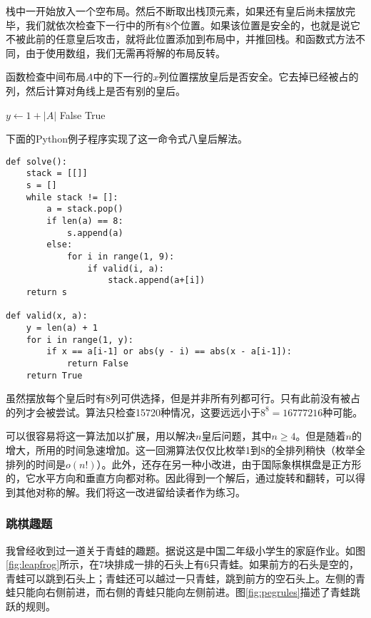 \documentclass[UTF8]{article}
\begin{document}
栈中一开始放入一个空布局。然后不断取出栈顶元素，如果还有皇后尚未摆放完毕，我们就依次检查下一行中的所有8个位置。如果该位置是安全的，也就是说它不被此前的任意皇后攻击，就将此位置添加到布局中，并推回栈。和函数式方法不同，由于使用数组，我们无需再将解的布局反转。

函数检查中间布局$A$中的下一行的$x$列位置摆放皇后是否安全。它去掉已经被占的列，然后计算对角线上是否有别的皇后。

\begin{algorithmic}[1]
  \State $y \gets 1 + |A|$
      \State \Return False
    \EndIf
  \EndFor
  \State \Return True
\EndFunction
\end{algorithmic}

下面的Python例子程序实现了这一命令式八皇后解法。

\lstset{language=Python}
\begin{lstlisting}
def solve():
    stack = [[]]
    s = []
    while stack != []:
        a = stack.pop()
        if len(a) == 8:
            s.append(a)
        else:
            for i in range(1, 9):
                if valid(i, a):
                    stack.append(a+[i])
    return s

def valid(x, a):
    y = len(a) + 1
    for i in range(1, y):
        if x == a[i-1] or abs(y - i) == abs(x - a[i-1]):
            return False
    return True
\end{lstlisting}

虽然摆放每个皇后时有8列可供选择，但是并非所有列都可行。只有此前没有被占的列才会被尝试。算法只检查15720种情况，这要远远小于$8^8 = 16777216$种可能\cite{wiki-8-queens}。

可以很容易将这一算法加以扩展，用以解决$n$皇后问题，其中$n \geq 4$。但是随着$n$的增大，所用的时间急速增加。这一回溯算法仅仅比枚举1到8的全排列稍快（枚举全排列的时间是$o(n!)$）。此外，还存在另一种小改进，由于国际象棋棋盘是正方形的，它水平方向和垂直方向都对称。因此得到一个解后，通过旋转和翻转，可以得到其他对称的解。我们将这一改进留给读者作为练习。

\subsubsection{跳棋趣题}

我曾经收到过一道关于青蛙的趣题。据说这是中国二年级小学生的家庭作业。如图\ref{fig:leapfrog}所示，在7块排成一排的石头上有6只青蛙。如果前方的石头是空的，青蛙可以跳到石头上；青蛙还可以越过一只青蛙，跳到前方的空石头上。左侧的青蛙只能向右侧前进，而右侧的青蛙只能向左侧前进。图\ref{fig:pegrules}描述了青蛙跳跃的规则。
\end{document}
